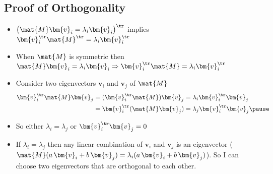 \begin{slide}
\section[-2]{Proof of Orthogonality}

\begin{PauseHighLight}
  \begin{itemize}
  \item $\left(\strut \mat{M}\bm{v}_i = \lambda_i\bm{v}_i\right)^\tr$
    implies $\bm{v}_i^\tr \mat{M}^\tr = \lambda_i\bm{v}_i^\tr$\pause
  \item When $\mat{M}$ is symmetric then $\mat{M}\bm{v}_i = \lambda_i\bm{v}_i
    \Rightarrow \bm{v}_i^\tr \mat{M} = \lambda_i\bm{v}_i^\tr$\pause
  \item Consider two eigenvectors $\bm{v}_i$ and $\bm{v}_j$ of $\mat{M}$
    \begin{align*}
      \bm{v}_i^\tr \mat{M} \bm{v}_j &= (\bm{v}_i^\tr \mat{M}) \bm{v}_j =
      \lambda_i  \bm{v}_i^\tr \bm{v}_j \\
      &= \bm{v}_i^\tr (\mat{M} \bm{v}_j)
      = \lambda_j  \bm{v}_i^\tr \bm{v}_j\pause
    \end{align*}
  \item So either $\lambda_i = \lambda_j$ or $\bm{v}_i^\tr \bm{v}_j=0$\pause
  \item If $\lambda_i = \lambda_j$ then any linear combination of
    $\bm{v}_i$ and $\bm{v}_j$ is an eigenvector
    ($\mat{M} (a\,\bm{v}_i + b\,\bm{v}_j) = \lambda_i (a\,\bm{v}_i +
    b\,\bm{v}_j) $)\pause.  So I can choose two eigenvectors that are
    orthogonal to each other.\pauseb
  \end{itemize}
\end{PauseHighLight}

\end{slide}

\Outline %

